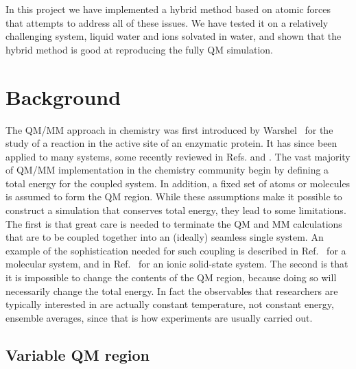 \documentclass[11pt]{revtex4}
\begin{document}
In this project we have implemented a hybrid method based on atomic
forces that attempts to address all of these issues.  We have tested
it on a relatively challenging system, liquid water and ions solvated
in water, and shown that the hybrid method is good at reproducing
the fully QM simulation.

\section{Background}

The QM/MM approach in chemistry was first introduced by
Warshel~\cite{warshel_j_mol_biol_1976a} for the study of a reaction
in the active site of an enzymatic protein.  It has since been
applied to many systems, some recently reviewed in
Refs. and
.  The vast majority of QM/MM
implementation in the chemistry community begin by defining a total
energy for the coupled system.  In addition, a fixed set of atoms
or molecules is assumed to form the QM region.  While these assumptions
make it possible to construct a simulation that conserves total
energy, they lead to some limitations.  The first is that great
care is needed to terminate the QM and MM calculations that are to
be coupled together into an (ideally) seamless single system.  An
example of the sophistication needed for such coupling is described
in Ref.~ for a molecular system, and in
Ref.~ for an ionic solid-state
system.  The second is that it is impossible to change the contents
of the QM region, because doing so will necessarily change the total
energy.  In fact the observables that researchers are typically
interested in are actually constant temperature, not constant energy,
ensemble averages, since that is how experiments are usually carried
out.

\subsection{Variable QM region}
\end{document}
